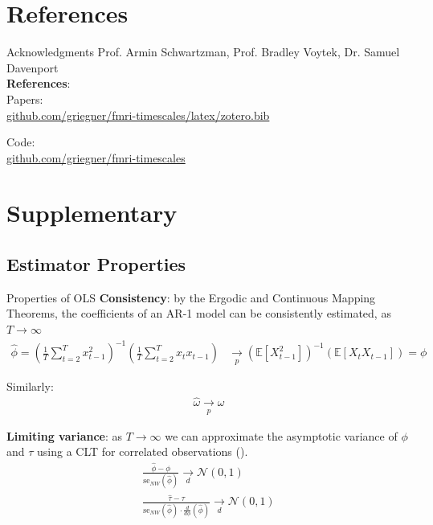 \documentclass[12pt]{beamer}
\begin{document}
\section{References}
\begin{frame}{Acknowledgments}
Prof. Armin Schwartzman, Prof. Bradley Voytek, Dr. Samuel Davenport\\
\vspace{1cm}
\textbf{References}:\\
Papers:\\
\href{https://github.com/griegner/fmri-timescales/blob/master/latex/zotero.bib}{github.com/griegner/fmri-timescales/latex/zotero.bib}

\vspace{0.5cm}
Code:\\
\href{https://github.com/griegner/fmri-timescales}{github.com/griegner/fmri-timescales}
\end{frame}


\section{Supplementary}
\subsection{Estimator Properties}

\begin{frame}{Properties of OLS}
\vspace{0.25cm}
\footnotesize
\textbf{Consistency}: by the Ergodic and Continuous Mapping Theorems, the coefficients of an AR-1 model can be consistently estimated, as $T \to \infty$
\begin{align}
    \hat\phi = (\frac{1}{T} \sum_{t=2}^T x_{t-1}^2)^{-1} ( \frac{1}{T} \sum_{t=2}^T x_t x_{t-1}) &\underset{p}{\to} (\mathbb{E}[X_{t-1}^2])^{-1}(\mathbb{E}[X_t X_{t-1}]) = \phi
\end{align}

Similarly:
\begin{align}
    \hat \omega \underset{p}{\to} \omega
\end{align}

\textbf{Limiting variance}: as $T\to\infty$ we can approximate the asymptotic variance of $\phi$ and $\tau$ using a CLT for correlated observations (\cite{hansen_econometrics_2022}).
\begin{align}
\frac{\hat\phi - \phi}{\text{se}_{NW}(\hat\phi)} \underset{d}{\to} \mathcal{N}(0, 1)\\
\frac{\hat{\tau} - \tau}{\text{se}_{NW}(\hat{\phi}) \cdot \frac{d}{d\phi}(\hat\phi)} \underset{d}{\to} \mathcal{N}(0,1)
\end{align}
\end{frame}
\end{document}
